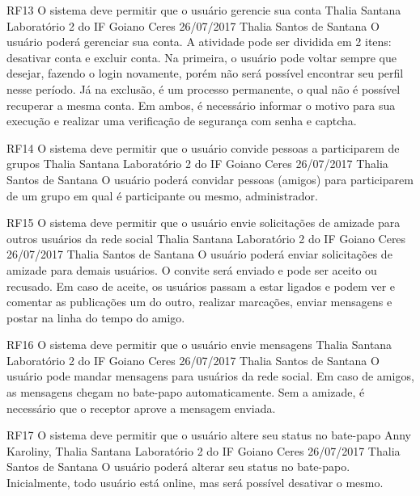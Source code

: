 \documentclass[versao=digital]{ifgoiano_ceres_tc_v2}
\begin{document}
\requisitoFuncional
{RF13}
{O sistema deve permitir que o usuário gerencie sua conta}
{Thalia Santana}
{Laboratório 2 do IF Goiano Ceres}
{26/07/2017}
{Thalia Santos de Santana}
{O usuário poderá gerenciar sua conta. A atividade pode ser dividida em 2 itens: desativar conta e excluir conta. Na primeira, o usuário pode voltar sempre que desejar, fazendo o login novamente, porém não será possível encontrar seu perfil nesse período. Já na exclusão, é um processo permanente,  o qual não é possível recuperar a mesma conta. Em ambos, é necessário informar o motivo para sua execução e realizar uma verificação de segurança com  senha e captcha.  
}

\requisitoFuncional
{RF14}
{O sistema deve permitir que o usuário convide pessoas a participarem de grupos}
{Thalia Santana}
{Laboratório 2 do IF Goiano Ceres}
{26/07/2017}
{Thalia Santos de Santana}
{O usuário poderá convidar pessoas (amigos) para participarem de um grupo em qual é participante ou mesmo, administrador.
}

\requisitoFuncional
{RF15}
{O sistema deve permitir que o usuário envie solicitações de amizade para outros usuários da rede social}
{Thalia Santana}
{Laboratório 2 do IF Goiano Ceres}
{26/07/2017}
{Thalia Santos de Santana}
{O usuário poderá enviar solicitações de amizade para demais usuários. O convite será enviado e pode ser aceito ou recusado.  Em caso de aceite, os usuários passam a estar ligados e podem ver e comentar as publicações um do outro, realizar marcações, enviar mensagens e postar na linha do tempo do amigo.
}

\requisitoFuncional
{RF16}
{O sistema deve permitir que o  usuário envie mensagens}
{Thalia Santana}
{Laboratório 2 do IF Goiano Ceres}
{26/07/2017}
{Thalia Santos de Santana}
{O usuário pode mandar mensagens para usuários da rede social. Em caso de amigos, as mensagens chegam no bate-papo automaticamente. Sem a amizade, é necessário que o receptor aprove a mensagem enviada.
}

\requisitoFuncional
{RF17}
{O sistema deve permitir que o usuário altere seu status no bate-papo}
{Anny Karoliny, Thalia Santana}
{Laboratório 2 do IF Goiano Ceres}
{26/07/2017}
{Thalia Santos de Santana}
{ O usuário poderá alterar seu status no bate-papo. Inicialmente, todo usuário está online, mas será possível desativar o mesmo.
}	
	
\end{document}
